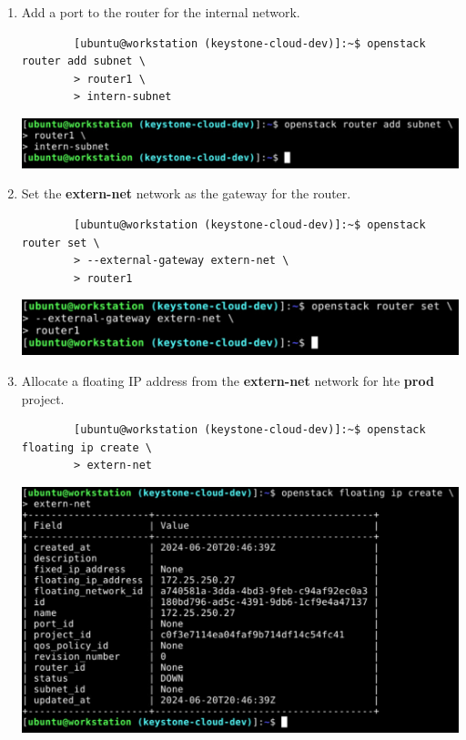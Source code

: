 \documentclass[letterpaper, 12pt]{article}
\begin{document}
\begin{enumerate}
    \item Add a port to the router for the internal network.
    \begin{lstlisting}
        [ubuntu@workstation (keystone-cloud-dev)]:~$ openstack router add subnet \
        > router1 \
        > intern-subnet
    \end{lstlisting}

    \begin{center}
        \includegraphics[width=\linewidth]{images/part1/step27.png}
    \end{center}

    \item Set the \textbf{extern-net} network as the gateway for the router.
    \begin{lstlisting}
        [ubuntu@workstation (keystone-cloud-dev)]:~$ openstack router set \
        > --external-gateway extern-net \
        > router1
    \end{lstlisting}

    \begin{center}
        \includegraphics[width=\linewidth]{images/part1/step28.png}
    \end{center}

    \item Allocate a floating IP address from the \textbf{extern-net} network for hte \textbf{prod} project.
    \begin{lstlisting}
        [ubuntu@workstation (keystone-cloud-dev)]:~$ openstack floating ip create \
        > extern-net
    \end{lstlisting}

    \begin{center}
        \includegraphics[width=\linewidth]{images/part1/step29.png}
    \end{center}


\end{enumerate}
\end{document}
